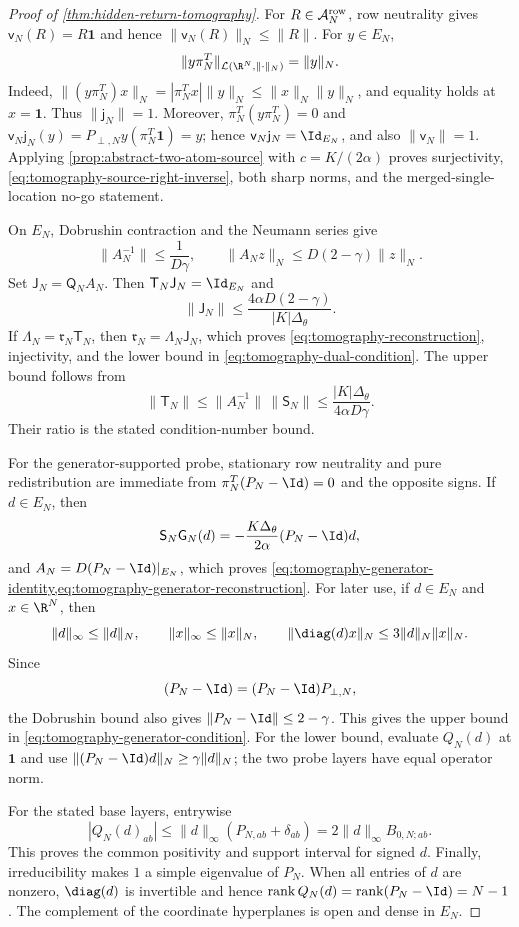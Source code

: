 \begin{proof}[Proof of \cref{thm:hidden-return-tomography}]
For \(R\in\mathcal A_N^{\rm row}\), row neutrality gives
\(\mathsf v_N(R)=R\mathbf1\) and hence
\(\|\mathsf v_N(R)\|_N\le\|R\|\).  For \(y\in E_N\),
\begin{equation}
 \|y\pi_N^T\|_{\mathcal L(\R^N,\|\cdot\|_N)}=\|y\|_N. \label{eq:rank-one-probe-norm}
\end{equation}
Indeed,
\(\|(y\pi_N^T)x\|_N=|\pi_N^Tx|\|y\|_N\le\|x\|_N\|y\|_N\),
and equality holds at \(x=\mathbf1\).  Thus
\(\|\mathsf j_N\|=1\).  Moreover,
\(\pi_N^T(y\pi_N^T)=0\) and
\(\mathsf v_N\mathsf j_N(y)
 =P_{\perp,N}y(\pi_N^T\mathbf1)=y\); hence
\(\mathsf v_N\mathsf j_N=\Id_{E_N}\), and also
\(\|\mathsf v_N\|=1\).  Applying
\cref{prop:abstract-two-atom-source} with \(c=K/(2\alpha)\) proves
surjectivity, \cref{eq:tomography-source-right-inverse}, both sharp norms,
and the merged-single-location no-go statement.

On \(E_N\), Dobrushin contraction and the Neumann series give
\begin{equation}
 \|A_N^{-1}\|\le\frac1{D\gamma},
 \qquad
 \|A_Nz\|_N\le D(2-\gamma)\|z\|_N.                 \label{eq:tomography-A-bounds}
\end{equation}
Set \(\mathsf J_N=\mathsf Q_NA_N\).  Then
\(\mathsf T_N\mathsf J_N=\Id_{E_N}\) and
\[
 \|\mathsf J_N\|
 \le\frac{4\alpha D(2-\gamma)}{|K|\Delta_\theta}.
\]
If \(\Lambda_N=\mathfrak r_N\mathsf T_N\), then
\(\mathfrak r_N=\Lambda_N\mathsf J_N\), which proves
\cref{eq:tomography-reconstruction}, injectivity, and the lower bound in
\cref{eq:tomography-dual-condition}.  The upper bound follows from
\[
 \|\mathsf T_N\|
 \le\|A_N^{-1}\|\,\|\mathsf S_N\|
 \le\frac{|K|\Delta_\theta}{4\alpha D\gamma}.
\]
Their ratio is the stated condition-number bound.

For the generator-supported probe, stationary row neutrality and pure redistribution are
immediate from \(\pi_N^T(P_N-\Id)=0\) and the opposite signs.  If
\(d\in E_N\), then
\[
 \mathsf S_N\mathsf G_N(d)
 =-\frac{K\Delta_\theta}{2\alpha}(P_N-\Id)d,
\]
and \(A_N=D(P_N-\Id)|_{E_N}\), which proves
\cref{eq:tomography-generator-identity,eq:tomography-generator-reconstruction}.
For later use, if \(d\in E_N\) and \(x\in\R^N\), then
\[
 \|d\|_\infty\le\|d\|_N,
 \qquad \|x\|_\infty\le\|x\|_N,
 \qquad
 \|\diag(d)x\|_N\le3\|d\|_N\|x\|_N.
\]
Since
\[
 (P_N-\Id)=(P_N-\Id)P_{\perp,N},
\]
the Dobrushin bound also gives
\(\|P_N-\Id\|\le2-\gamma\).  This gives the upper bound in
\cref{eq:tomography-generator-condition}.  For the lower bound, evaluate
\(Q_N(d)\) at \(\mathbf1\) and use
\(\|(P_N-\Id)d\|_N\ge\gamma\|d\|_N\); the two probe layers have equal
operator norm.

For the stated base layers, entrywise
\[
 |Q_N(d)_{ab}|
 \le\|d\|_\infty(P_{N,ab}+\delta_{ab})
 =2\|d\|_\infty B_{0,N;ab}.
\]
This proves the common positivity and support interval for signed \(d\).
Finally, irreducibility makes \(1\) a simple eigenvalue of \(P_N\).  When
all entries of \(d\) are nonzero, \(\diag(d)\) is invertible and hence
\(\operatorname{rank}Q_N(d)=\operatorname{rank}(P_N-\Id)=N-1\).
The complement of the coordinate hyperplanes is open and dense in \(E_N\).
\end{proof}

